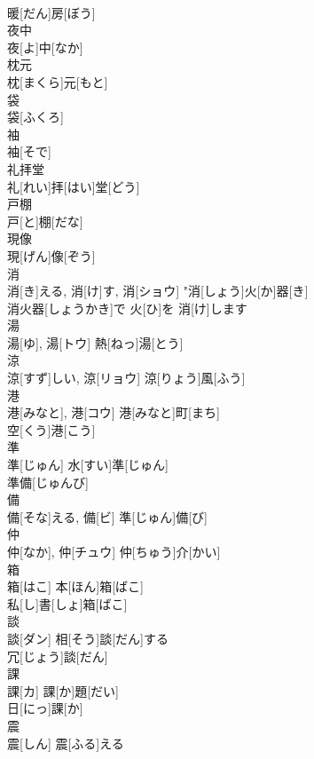 \documentclass[8pt]{extreport}
\begin{document}
\begin{CJK}{UTF8}{min}
\\	暖[だん]房[ぼう]	
\\	夜中	
\\	夜[よ]中[なか]	
\\	枕元	
\\	枕[まくら]元[もと]	
\\	袋	
\\	袋[ふくろ]	
\\	袖	
\\	袖[そで]	
\\	礼拝堂	
\\	礼[れい]拝[はい]堂[どう]	
\\	戸棚	
\\	戸[と]棚[だな]	
\\	現像	
\\	現[げん]像[ぞう]	
\\	消	
\\	消[き]える, 消[け]す, 消[ショウ]	"消[しょう]火[か]器[き] 
\\	消火器[しょうかき]で 火[ひ]を 消[け]します 
\\	湯	
\\	湯[ゆ], 湯[トウ]	熱[ねっ]湯[とう] 
\\	涼	
\\	涼[すず]しい, 涼[リョウ]	涼[りょう]風[ふう] 
\\	港	
\\	港[みなと], 港[コウ]	港[みなと]町[まち] 
\\	空[くう]港[こう] 
\\	準	
\\	準[じゅん]	水[すい]準[じゅん] 
\\	準備[じゅんび] 
\\	備	
\\	備[そな]える, 備[ビ]	準[じゅん]備[び] 
\\	仲	
\\	仲[なか], 仲[チュウ]	仲[ちゅう]介[かい] 
\\	箱	
\\	箱[はこ]	本[ほん]箱[ばこ] 
\\	私[し]書[しょ]箱[ばこ] 
\\	談	
\\	談[ダン]	相[そう]談[だん]する 
\\	冗[じょう]談[だん] 
\\	課	
\\	課[カ]	課[か]題[だい] 
\\	日[にっ]課[か] 
\\	震	
\\	震[しん]	震[ふる]える 

\end{CJK}
\end{document}
